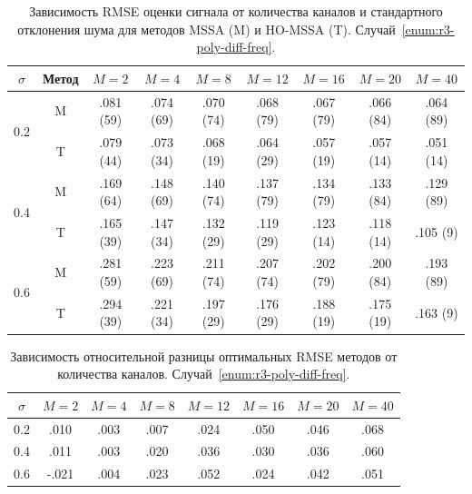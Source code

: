 \documentclass[specialist,
  substylefile = spbu.rtx,
subf,href,colorlinks=true, 12pt]{disser}
\theoremstyle{plain}
\theoremstyle{definition}
\theoremstyle{remark}
\begin{document}
\begin{table}[!ht]
  \centering
  \caption{Зависимость RMSE оценки сигнала от количества каналов и
    стандартного отклонения шума для методов MSSA (M) и HO-MSSA (T).
  Случай~\ref{enum:r3-poly-diff-freq}.}
  \label{tab:r3-rmse-poly-diff-freq}
  {\small
    \begin{tabular}{c|c|ccccccc}
      $\sigma$ & Метод & $M = 2$ & $M = 4$ & $M = 8$ & $M = 12$ &
      $M = 16$ & $M
      = 20$ & $M = 40$ \\ \hline
      \multirow{2}{1.3em}{0.2} & M & .081 (59) & .074 (69) & .070 (74) &
      .068 (79) & .067 (79) & .066 (84) & .064 (89) \\
      & T & .079 (44) & .073 (34) & .068 (19) & .064 (29) & .057 (19)
      & .057 (14) & .051 (14)\\
      \hline
      \multirow{2}{1.3em}{0.4} & M & .169 (64) & .148 (69) & .140 (74) &
      .137 (79) & .134 (79) & .133 (84) & .129 (89) \\
      & T & .165 (39) & .147 (34) & .132 (29) & .119 (29) & .123 (14)
      & .118 (14) & .105 (9) \\
      \hline
      \multirow{2}{1.3em}{0.6} & M & .281 (59) & .223 (69) & .211 (74) &
      .207 (74) & .202 (79) & .200 (84) & .193 (89) \\
      & T & .294 (39) & .221 (34) & .197 (29) & .176 (29) & .188 (19)
      & .175 (19) & .163 (9) \\
      \hline
    \end{tabular}
  }
\end{table}
\begin{table}[!ht]
  \centering
  \caption{Зависимость относительной разницы оптимальных RMSE методов от
  количества каналов. Случай~\ref{enum:r3-poly-diff-freq}.}
  \label{tab:r3-errdiff-poly-diff-freq}
  \begin{tabular}{c|ccccccc}
    $\sigma$ & $M = 2$ & $M = 4$ & $M = 8$ & $M = 12$ & $M = 16$ & $M
    = 20$ & $M = 40$ \\ \hline
    0.2 & .010  & .003 & .007 & .024 & .050 & .046 & .068 \\
    \hline
    0.4 & .011  & .003 & .020 & .036 & .030 & .036 & .060 \\
    \hline
    0.6 & -.021 & .004 & .023 & .052 & .024 & .042 & .051 \\
    \hline
  \end{tabular}
\end{table}
\end{document}
